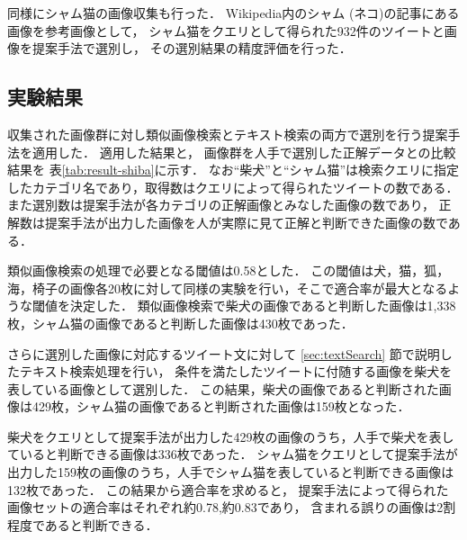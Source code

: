 \documentclass{deimj}
\begin{document}
同様にシャム猫の画像収集も行った．
Wikipedia内のシャム (ネコ)の記事にある画像を参考画像として，
シャム猫をクエリとして得られた932件のツイートと画像を提案手法で選別し，
その選別結果の精度評価を行った．

\subsection{実験結果}
\label{sec:expresult}

収集された画像群に対し類似画像検索とテキスト検索の両方で選別を行う提案手法を適用した．
適用した結果と，
画像群を人手で選別した正解データとの比較結果を
表\ref{tab:result-shiba}に示す．
なお“柴犬”と“シャム猫”は検索クエリに指定したカテゴリ名であり，取得数はクエリによって得られたツイートの数である．
また選別数は提案手法が各カテゴリの正解画像とみなした画像の数であり，
正解数は提案手法が出力した画像を人が実際に見て正解と判断できた画像の数である．

類似画像検索の処理で必要となる閾値は0.58とした．
この閾値は犬，猫，狐，海，椅子の画像各20枚に対して同様の実験を行い，そこで適合率が最大となるような閾値を決定した．
類似画像検索で柴犬の画像であると判断した画像は1,338枚，シャム猫の画像であると判断した画像は430枚であった．

さらに選別した画像に対応するツイート文に対して
\ref{sec:textSearch}
節で説明したテキスト検索処理を行い，
条件を満たしたツイートに付随する画像を柴犬を表している画像として選別した．
この結果，柴犬の画像であると判断された画像は429枚，シャム猫の画像であると判断された画像は159枚となった．


柴犬をクエリとして提案手法が出力した429枚の画像のうち，人手で柴犬を表していると判断できる画像は336枚であった．
シャム猫をクエリとして提案手法が出力した159枚の画像のうち，人手でシャム猫を表していると判断できる画像は132枚であった．
この結果から適合率を求めると，
提案手法によって得られた画像セットの適合率はそれぞれ約0.78,約0.83であり，
含まれる誤りの画像は2割程度であると判断できる．
\end{document}
